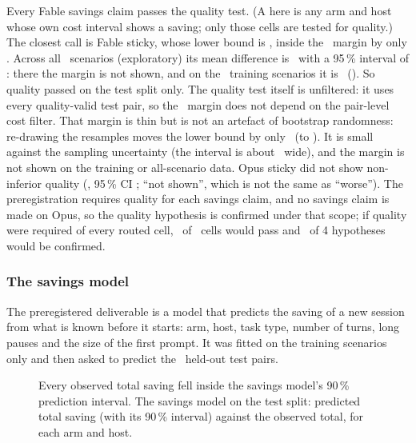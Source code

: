 Every Fable savings claim passes the quality test. (A  here is any arm and host whose
own cost interval shows a saving; only those cells are tested for quality.) The closest call is Fable sticky,
whose lower bound is \QFableStickyLow, inside the \NIMargin\ margin by only \QFableStickyMarginGap.
Across all \QAllScen\ scenarios (exploratory) its mean difference is \QAllFableSticky\ with a 95\,\%
interval of \QAllFableStickyCI: there the margin is not shown, and on the \NTrain\ training scenarios it is
\RvQTrainFableSticky\ (\RvQTrainFableStickyCI). So quality passed on the test split only. The quality test itself
is unfiltered: it uses every quality-valid test pair, so the \QFableStickyMarginGap\ margin does not depend on the
pair-level cost filter. That margin is thin but is not an artefact of bootstrap randomness: re-drawing the
resamples moves the lower bound by only \RvQNoise\ (to \RvQAltLow). It is small against the sampling uncertainty (the
interval is about \RvQWidth\ wide), and the margin is not shown on the training or all-scenario data. Opus sticky did not show
non-inferior quality (\QOpusSticky, 95\,\% CI \QOpusStickyCI; ``not shown'', which is not the same as ``worse'').
The preregistration requires quality for each savings claim, and no savings claim is made on Opus, so the quality
hypothesis is confirmed under that scope; if quality were required of every routed cell, \RvNQualCells\ of
\RvNRoutedCells\ cells would pass and \RvNHypAllQuality\ of 4 hypotheses would be confirmed.

\subsubsection{The savings model}\label{vt:sec:modelcheck}

The preregistered deliverable is a model that predicts the saving of a new session from what is known before
it starts: arm, host, task type, number of turns, long pauses and the size of the first prompt. It was fitted
on the training scenarios only and then asked to predict the \MCPairs\ held-out test pairs.

\begin{figure}[tbp]
\centering
{}\par\smallskip

\caption{Every observed total saving fell inside the savings model's 90\,\% prediction interval. The savings model on the test split: predicted total saving (with its 90\,\% interval) against the
observed total, for each arm and host.}
\label{vt:fig:model}
\end{figure}

